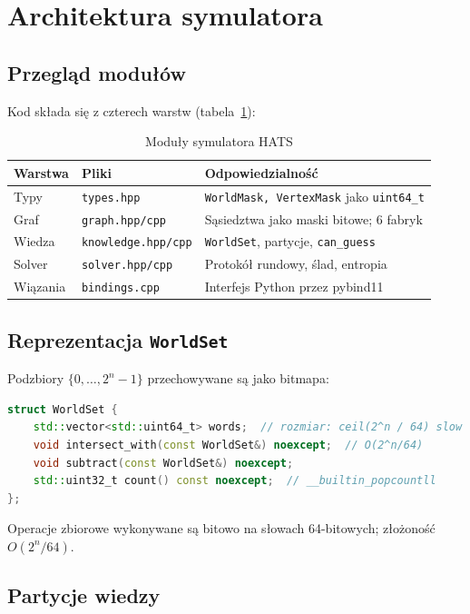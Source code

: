 \documentclass[12pt,a4paper]{article}
\theoremstyle{plain}
\theoremstyle{definition}
\theoremstyle{remark}
\begin{document}
\section{Architektura symulatora}

\subsection{Przegląd modułów}

Kod składa się z czterech warstw (tabela~\ref{tab:layers}):

\begin{table}[h]
\centering
\caption{Moduły symulatora HATS}
\label{tab:layers}
\begin{tabular}{lll}
\toprule
Warstwa & Pliki & Odpowiedzialność \\
\midrule
Typy & \texttt{types.hpp} & \texttt{WorldMask, VertexMask} jako \texttt{uint64\_t} \\
Graf & \texttt{graph.hpp/cpp} & Sąsiedztwa jako maski bitowe; 6 fabryk \\
Wiedza & \texttt{knowledge.hpp/cpp} & \texttt{WorldSet}, partycje, \texttt{can\_guess} \\
Solver & \texttt{solver.hpp/cpp} & Protokół rundowy, ślad, entropia \\
Wiązania & \texttt{bindings.cpp} & Interfejs Python przez pybind11 \\
\bottomrule
\end{tabular}
\end{table}

\subsection{Reprezentacja \texttt{WorldSet}}

Podzbiory $\{0,\ldots,2^n{-}1\}$ przechowywane są jako bitmapa:
\begin{lstlisting}[language=C++, caption={Struktura WorldSet}]
struct WorldSet {
    std::vector<std::uint64_t> words;  // rozmiar: ceil(2^n / 64) slow
    void intersect_with(const WorldSet&) noexcept;  // O(2^n/64)
    void subtract(const WorldSet&) noexcept;
    std::uint32_t count() const noexcept;  // __builtin_popcountll
};
\end{lstlisting}
Operacje zbiorowe wykonywane są bitowo na słowach 64-bitowych; złożoność $O(2^n/64)$.

\subsection{Partycje wiedzy}
\end{document}
